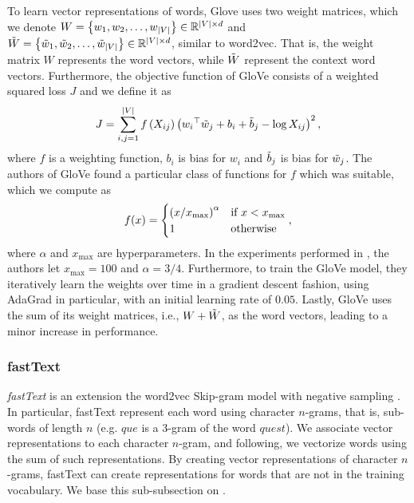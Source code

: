 To learn vector representations of words, Glove uses two weight matrices, which we denote $W=\left\{w_1, w_2, \ldots, w_{|V|}\right\} \in \mathbb{R}^{|V| \times d}$ and $\Tilde{W}=\left\{\Tilde{w}_1, \Tilde{w}_2, \ldots, \Tilde{w}_{|V|}\right\} \in \mathbb{R}^{|V| \times d}$, similar to word2vec. That is, the weight matrix $W$ represents the word vectors, while $\Tilde{W}$ represent the context word vectors. Furthermore, the objective function of GloVe consists of a weighted squared loss $J$ and we define it as
\begin{align}
    J = \sum\limits_{i, j = 1}^{|V|} f \left(X_{ij}\right) \left({w_i}^\top \Tilde{w}_j + b_i + \Tilde{b}_j - \log X_{ij}\right)^2,
    \label{eqn:glove-loss}
\end{align}
where $f$ is a weighting function, $b_i$ is bias for $w_i$ and $\Tilde{b}_j$ is bias for $\Tilde{w}_j$. The authors of GloVe found a particular class of functions for $f$ which was suitable, which we compute as
\begin{align}
    f(x) = \begin{cases}
        \left(x / x_{\text{max}}\right)^\alpha & \mbox{if } x < x_{\text{max}} \\
        1 & \text{otherwise}
    \end{cases},
    \label{eqn:glove-loss-f-function}
\end{align}
where $\alpha$ and $x_{\text{max}}$ are hyperparameters. In the experiments performed in \cite{pennington2014glove}, the authors let $x_{\text{max}}=100$ and $\alpha=3/4$. Furthermore, to train the GloVe model, they iteratively learn the weights over time in a gradient descent fashion, using AdaGrad \cite{Duchi2011} in particular, with an initial learning rate of $0.05$. Lastly, GloVe uses the sum of its weight matrices, i.e., $W + \Tilde{W}$, as the word vectors, leading to a minor increase in performance.

\subsubsection{fastText}
\label{sec:fasttext}
\textit{fastText} is an extension the word2vec Skip-gram model with negative sampling \cite{bojanowski2017enriching}. In particular, fastText represent each word using character $n$-grams, that is, sub-words of length $n$ (e.g. $\textit{que}$ is a $3$-gram of the word $\textit{quest}$). We associate vector representations to each character $n$-gram, and following, we vectorize words using the sum of such representations. By creating vector representations of character $n$-grams, fastText can create representations for words that are not in the training vocabulary. We base this sub-subsection on \cite{bojanowski2017enriching}.

